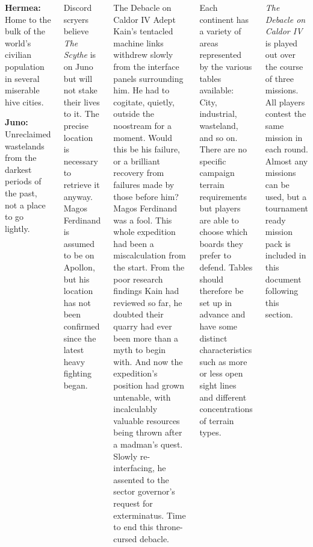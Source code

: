 \begin{columns}
\begin{squishitemize}
  \item \textbf{Hermea:} Home to the bulk of the world's civilian
    population in several miserable hive cities.

  \item \textbf{Juno:} Unreclaimed wastelands from the darkest periods
    of the past, not a place to go lightly.
  \end{squishitemize}

  Discord scryers believe \emph{The Scythe} is on Juno but will not
  stake their lives to it.  The precise location is necessary to
  retrieve it anyway.  Magos Ferdinand is assumed to be on Apollon,
  but his location has not been confirmed since the latest heavy
  fighting began.

\columnbreak
\begin{sidestory}{1.7in}{The Debacle on Caldor IV}
  Adept Kain's tentacled machine links withdrew slowly from the
  interface panels surrounding him. He had to cogitate, quietly,
  outside the noostream for a moment. Would this be his failure, or a
  brilliant recovery from failures made by those before him? Magos
  Ferdinand was a fool. This whole expedition had been a
  miscalculation from the start. From the poor research findings Kain
  had reviewed so far, he doubted their quarry had ever been more than
  a myth to begin with. And now the expedition's position had grown
  untenable, with incalculably valuable resources being thrown after a
  madman's quest. Slowly re-interfacing, he assented to the sector
  governor's request for exterminatus. Time to end this throne-cursed
  debacle.
\end{sidestory}


Each continent has a variety of areas represented by the various
tables available: City, industrial, wasteland, and so on.  There are
no specific campaign terrain requirements but players are able to
choose which boards they prefer to defend.  Tables should therefore be
set up in advance and have some distinct characteristics such as more
or less open sight lines and different concentrations of terrain
types.



\emph{The Debacle on Caldor IV} is played out over the course of three
missions.  All players contest the same mission in each round.  Almost
any missions can be used, but a tournament ready mission pack is
included in this document following this section.


\end{columns}
